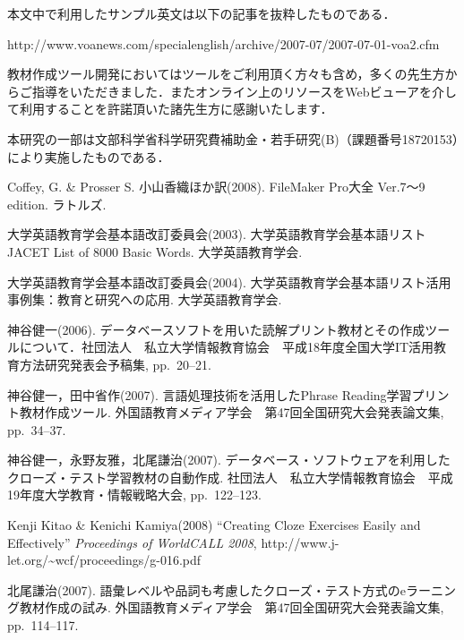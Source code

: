 \documentclass[japanese]{jnlp_1.4}
\begin{document}
\acknowledgment
\noindent 本文中で利用したサンプル英文は以下の記事を抜粋したものである．

\noindent
http://www.voanews.com/specialenglish/archive/2007-07/2007-07-01-voa2.cfm

\vspace{1\baselineskip}\noindent
教材作成ツール開発においてはツールをご利用頂く方々も含め，多くの先生方からご指導をいただきました．またオンライン上のリソースをWebビューアを介して利用することを許諾頂いた諸先生方に感謝いたします．

\vspace{1\baselineskip}\noindent 本研究の一部は文部科学省科学研究費補助金・若手研究(B)（課題番号18720153）により実施したものである．


\begin{thebibliography}{}

\item Coffey, G. \& Prosser S. 小山香織ほか訳(2008). FileMaker Pro大全 Ver.7〜9 edition. ラトルズ.

\item 大学英語教育学会基本語改訂委員会(2003). 大学英語教育学会基本語リスト JACET List of 8000 Basic Words. 大学英語教育学会.

\item 大学英語教育学会基本語改訂委員会(2004). 大学英語教育学会基本語リスト活用事例集：教育と研究への応用. 大学英語教育学会.

\item 神谷健一(2006). データベースソフトを用いた読解プリント教材とその作成ツールについて．社団法人　私立大学情報教育協会　平成18年度全国大学IT活用教育方法研究発表会予稿集, pp.~20--21.

\item 神谷健一，田中省作(2007). 言語処理技術を活用したPhrase Reading学習プリント教材作成ツール. 外国語教育メディア学会　第47回全国研究大会発表論文集, pp.~34--37.

\item 神谷健一，永野友雅，北尾謙治(2007). データベース・ソフトウェアを利用したクローズ・テスト学習教材の自動作成. 社団法人　私立大学情報教育協会　平成19年度大学教育・情報戦略大会, pp.~122--123.

\item Kenji Kitao \& Kenichi Kamiya(2008) ``Creating Cloze Exercises Easily and Effectively'' \textit{Proceedings of WorldCALL 2008}, http://www.j-let.org/\textasciitilde wcf/proceedings/g-016.pdf

\item 北尾謙治(2007). 語彙レベルや品詞も考慮したクローズ・テスト方式のeラーニング教材作成の試み. 外国語教育メディア学会　第47回全国研究大会発表論文集, pp.~114--117.


\end{thebibliography}
\end{document}
